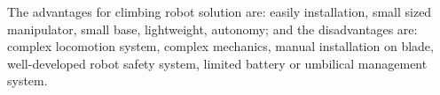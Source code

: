 The advantages for climbing robot solution are: easily installation, small sized
manipulator, small base, lightweight, autonomy; and the disadvantages are:
complex locomotion system, complex mechanics, manual installation on blade,
well-developed robot safety system, limited battery or umbilical management
system. 

